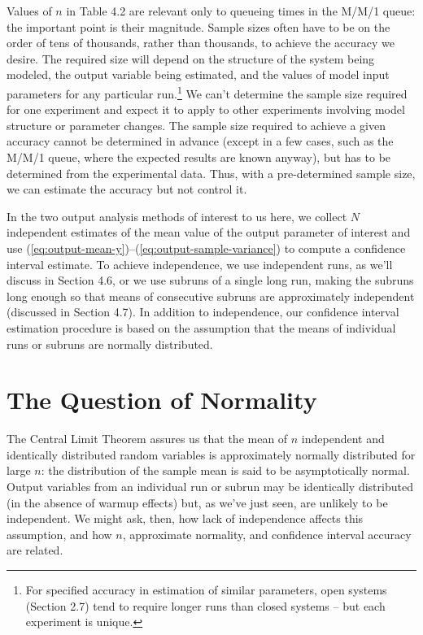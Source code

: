Values of $n$ in Table 4.2 are relevant only to queueing times in the M/M/1
queue: the important point is their magnitude. Sample sizes often have to be
on the order of tens of thousands, rather than thousands, to achieve the
accuracy we desire. The required size will depend on the structure of the
system being modeled, the output variable being estimated, and the values of
model input parameters for any particular run.\footnote{For specified accuracy
in estimation of similar parameters, open systems (Section 2.7) tend to
require longer runs than closed systems -- but each experiment is unique.} We
can't determine the sample size required for one experiment and expect it to
apply to other experiments involving model structure or parameter changes.
The sample size required to achieve a given accuracy cannot be determined in
advance (except in a few cases, such as the M/M/1 queue, where the expected
results are known anyway), but has to be determined from the experimental
data. Thus, with a pre-determined sample size, we can estimate the accuracy
but not control it.

In the two output analysis methods of interest to us here, we collect $N$
independent estimates of the mean value of the output parameter of interest
and use (\ref{eq:output-mean-y})--(\ref{eq:output-sample-variance}) to compute
a confidence interval estimate. To achieve independence, we use independent
runs, as we'll discuss in Section 4.6, or we use subruns of a single long run,
making the subruns long enough so that means of consecutive subruns are
approximately independent (discussed in Section 4.7). In addition to
independence, our confidence interval estimation procedure is based on the
assumption that the means of individual runs or subruns are normally
distributed.

\section{The Question of Normality}
\label{sec:question-of-normality}

The Central Limit Theorem assures us that the mean of $n$ independent and
identically distributed random variables is approximately normally
distributed for large $n$: the distribution of the sample mean is said to be
asymptotically normal. Output variables from an individual run or subrun
\noindent may be identically distributed (in the absence of warmup effects) but, as we've
just seen, are unlikely to be independent. We might ask, then, how lack of
independence affects this assumption, and how $n$, approximate normality, and
confidence interval accuracy are related.

